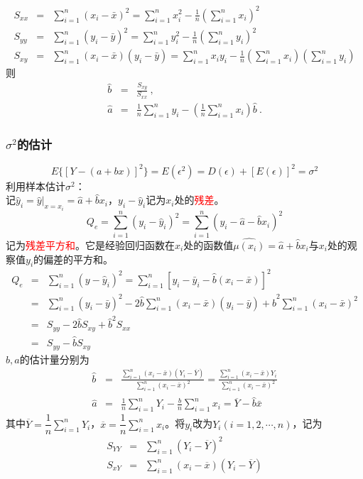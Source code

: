 \documentclass[12pt,a4paper]{article}
\begin{document}
\begin{eqnarray}
\nonumber S_{xx} &=& \sum_{i=1}^n (x_i -\bar{x})^2 = \sum_{i=1}^n x^2_i -\frac{1}{n} \left(\sum\limits_{i=1}^n x_i  \right)^2\\
\nonumber S_{yy} &=& \sum_{i=1}^n (y_i -\bar{y})^2 = \sum_{i=1}^n y^2_i -\frac{1}{n} \left(\sum_{i=1}^n y_i  \right)^2\\
S_{xy} &=& \sum_{i=1}^n (x_i -\bar{x}) (y_i -\bar{y}) = \sum_{i=1}^n x_i y_i -\frac{1}{n} \left(\sum_{i=1}^n x_i  \right) \left(\sum_{i=1}^n y_i  \right)
\end{eqnarray}
则
\begin{eqnarray}
\nonumber \hat{b} &=& \frac{S_{xy}}{S_{xx}} ~,\\
\hat{a} &=& \frac{1}{n} \sum_{i=1}^n y_i -\left(\frac{1}{n} \sum_{i=1}^n x_i \right) \hat{b} ~.
\end{eqnarray}

\subsubsection{$\sigma^2$的估计}
\begin{equation*}
E\{[Y-(a+bx)]^2 \} = E(\epsilon^2) = D(\epsilon) +[E(\epsilon)]^2 = \sigma^2
\end{equation*}
利用样本估计$\sigma^2$：\\
记$\hat{y}_i = \hat{y}|_{x=x_i} = \hat{a} +\hat{b} x_i$，$y_i -\hat{y}_i$记为$x_i$处的\textcolor{red}{残差}。
\begin{equation}
Q_e = \sum_{i=1}^n (y_i -\hat{y}_i)^2 = \sum_{i=1}^n (y_i -\hat{a} -\hat{b} x_i)^2
\end{equation}
记为\textcolor{red}{残差平方和}。它是经验回归函数在$x_i$处的函数值$\widehat{\mu(x_i)} = \hat{a} + \hat{b} x_i$与$x_i$处的观察值$y_i$的偏差的平方和。
\begin{eqnarray*}
Q_e &=& \sum_{i=1}^n (y-\hat{y}_i)^2 =  \sum_{i=1}^n [y_i-\bar{y}_i -\hat{b}(x_i -\bar{x} )]^2 \\
&=& \sum_{i=1}^n (y_i -\bar{y})^2 -2\hat{b} \sum_{i=1}^n (x_i -\bar{x})(y_i -\bar{y}) + \hat{b}^2 \sum_{i=1}^n (x_i-\bar{x})^2 \\
&=& S_{yy} -2\hat{b} S_{xy} +\hat{b}^2 S_{xx} \\
&=& S_{yy} -\hat{b} S_{xy}
\end{eqnarray*}
$b, a$的估计量分别为
\begin{eqnarray}
\nonumber \hat{b} &=& \frac{\sum\limits_{i=1}^n (x_i -\bar{x})(Y_i -\overline{Y}) }{\sum\limits_{i=1}^n (x_i -\bar{x})^2} =  \frac{ \sum\limits_{i=1}^n (x_i -\bar{x})Y_i }{\sum\limits_{i=1}^n (x_i -  \bar{x})^2 } \\
\hat{a} &=& \frac{1}{n} \sum_{i=1}^n Y_i -\frac{\hat{b}}{n} \sum_{i=1}^n x_i = \overline{Y} - \hat{b} \bar{x}
\end{eqnarray}
其中$\overline{Y} =\dfrac{1}{n} \sum\limits_{i=1}^n Y_i$，$\overline{x} = \dfrac{1}{n} \sum\limits_{i=1}^n x_i$。将$y_i$改为$Y_i (i = 1, 2, \cdots, n)$，记为
\begin{eqnarray*}
S_{YY} &=& \sum\limits_{i=1}^n (Y_i -\overline{Y})^2 \\
S_{xY} &=& \sum\limits_{i=1}^n (x_i -\overline{x})(Y_i -\overline{Y})
\end{eqnarray*}
\end{document}
